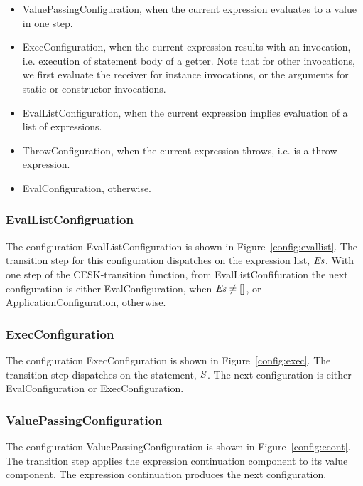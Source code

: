 \documentclass[a4paper,oneside,fleqn]{article}
\begin{document}
\begin{itemize}
    \item ValuePassingConfiguration, when the current expression evaluates to a value in one step.
    \item ExecConfiguration, when the current expression results with an invocation, i.e. execution of statement body of a getter.
        Note that for other invocations, we first evaluate the receiver for instance invocations, or the arguments for static or constructor invocations.
    \item EvalListConfiguration, when the current expression implies evaluation of a list of expressions.
    \item ThrowConfiguration, when the current expression throws, i.e. is a throw expression.
    \item EvalConfiguration, otherwise.
\end{itemize}


\subsubsection{EvalListConfigruation}
\label{subsubsec:evallistconfig}

The configuration EvalListConfiguration is shown in Figure~\ref{config:evallist}.
The transition step for this configuration dispatches on the expression list, $\mathit{E}\mathit{s}$.
With one step of the CESK-transition function, from EvalListConfifuration the next configuration is either EvalConfiguration, when $\mathit{E}\mathit{s} \neq []$, or ApplicationConfiguration, otherwise.


\subsubsection{ExecConfiguration}
\label{subsubsec:execconfig}

The configuration ExecConfiguration is shown in Figure~\ref{config:exec}.
The transition step dispatches on the statement, $\mathit{S}$.
The next configuration is either EvalConfiguration or ExecConfiguration.


\subsubsection{ValuePassingConfiguration}
\label{suubsubsec:valuepassingconfig}

The configuration ValuePassingConfiguration is shown in Figure~\ref{config:econt}.
The transition step applies the expression continuation component to its value component.
The expression continuation produces the next configuration.
\end{document}
